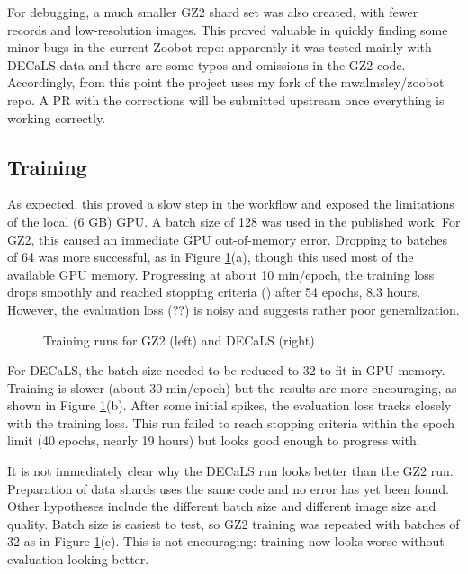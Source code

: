 \documentclass[preprint]{aastex631}
\newcommand{\todo}{\color{red}{TODO}\color{black}\hspace{2mm}}
\begin{document}
For debugging, a much smaller GZ2 shard set was also created, with fewer records and low-resolution images. This proved valuable in quickly finding some minor bugs in the current Zoobot repo: apparently it was tested mainly with DECaLS data and there are some typos and omissions in the GZ2 code. Accordingly, from this point the project uses my fork of the mwalmsley/zoobot repo. A PR with the corrections will be submitted upstream once everything is working correctly.

\subsection{Training}

As expected, this proved a slow step in the workflow and exposed the limitations of the local (6 GB) GPU. A batch size of 128 was used in the published work. For GZ2, this caused an immediate GPU out-of-memory error. Dropping to batches of 64 was more successful, as in Figure \ref{fig:train_plots}(a), though this used most of the available GPU memory. Progressing at about 10 min/epoch, the training loss drops smoothly and reached stopping criteria (\todo) after 54 epochs, 8.3 hours. However, the evaluation loss (??) is noisy and suggests rather poor generalization.


\begin{figure}
	\caption{Training runs for GZ2 (left) and DECaLS (right) \label{fig:train_plots}}
\end{figure}


For DECaLS, the batch size needed to be reduced to 32 to fit in GPU memory. Training is slower (about 30 min/epoch) but the results are more encouraging, as shown in Figure \ref{fig:train_plots}(b). After some initial spikes, the evaluation loss tracks closely with the training loss. This run failed to reach stopping criteria within the epoch limit (40 epochs, nearly 19 hours) but looks good enough to progress with.

It is not immediately clear why the DECaLS run looks better than the GZ2 run. Preparation of data shards uses the same code and no error has yet been found. Other hypotheses include the different batch size and different image size and quality. Batch size is easiest to test, so GZ2 training was repeated with batches of 32 as in Figure \ref{fig:train_plots}(c). This is not encouraging: training now looks worse without evaluation looking better.
\end{document}
